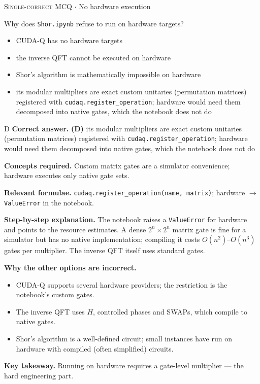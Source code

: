 \documentclass[11pt,a4paper]{article}
\newcommand{\optlabel}[1]{\textbf{(#1)}}
\newcommand{\correctlabel}[1]{\textcolor{okgreen}{\textbf{(#1)}\,\ding{51}}}
\newenvironment{qitem}[1]{\begin{list}{}{\setlength{\leftmargin}{3.3em}\setlength{\labelwidth}{3.1em}%
  \setlength{\labelsep}{0.2em}\setlength{\topsep}{3pt}\setlength{\parsep}{3pt}}\item[\textbf{Q.#1}\hfill]}{\end{list}}
\newcommand{\qsep}{\par\vspace{2pt}{\color{black!15}\hrule}\vspace{4pt}}
\newcommand{\qmeta}[2]{{\footnotesize\color{black!60}\textsc{#1} \;$\cdot$\; #2}\par}
\begin{document}
\begin{qitem}{68}
\qmeta{Single-correct MCQ}{No hardware execution}
Why does \texttt{Shor.ipynb} refuse to run on hardware targets?
\begin{itemize}[leftmargin=2.6em, labelsep=0.4em, itemsep=2pt, topsep=3pt]
\item[\optlabel{A}] CUDA-Q has no hardware targets
\item[\optlabel{B}] the inverse QFT cannot be executed on hardware
\item[\optlabel{C}] Shor's algorithm is mathematically impossible on hardware
\item[\correctlabel{D}] its modular multipliers are exact custom unitaries (permutation matrices) registered with \texttt{cudaq.register\_operation}; hardware would need them decomposed into native gates, which the notebook does not do
\end{itemize}
\end{qitem}
\begin{solbox}{D}
\textbf{\color{brand}Correct answer.} \textcolor{okgreen}{\textbf{(D)}} its modular multipliers are exact custom unitaries (permutation matrices) registered with \texttt{cudaq.register\_operation}; hardware would need them decomposed into native gates, which the notebook does not do

\textbf{\color{brand}Concepts required.} Custom matrix gates are a simulator convenience; hardware executes only native gate sets.

\textbf{\color{brand}Relevant formulae.} \texttt{cudaq.register\_operation(name, matrix)}; hardware $\to$ \texttt{ValueError} in the notebook.

\textbf{\color{brand}Step-by-step explanation.} The notebook raises a \texttt{ValueError} for hardware and points to the resource estimates. A dense $2^n\times2^n$ matrix gate is fine for a simulator but has no
native implementation; compiling it costs $O(n^2)$--$O(n^3)$ gates per multiplier. The inverse QFT itself uses standard gates.

\textbf{\color{brand}Why the other options are incorrect.}
\begin{itemize}[leftmargin=2.4em, itemsep=1pt, topsep=2pt]
\item[\textbf{(A)}] CUDA-Q supports several hardware providers; the restriction is the notebook's custom gates.
\item[\textbf{(B)}] The inverse QFT uses $H$, controlled phases and SWAPs, which compile to native gates.
\item[\textbf{(C)}] Shor's algorithm is a well-defined circuit; small instances have run on hardware with compiled (often simplified) circuits.
\end{itemize}
\textbf{\color{brand}Key takeaway.} Running on hardware requires a gate-level multiplier --- the hard engineering part.
\end{solbox}
\qsep
\end{document}
